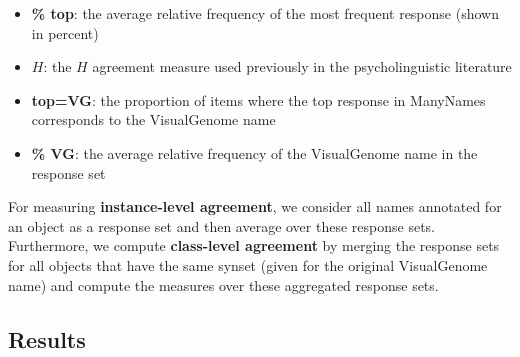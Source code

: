 \begin{itemize}
\item \textbf{\% top}: the average relative frequency of the most frequent response (shown in percent)
\item \textbf{$H$}: the $H$ agreement measure used previously in the psycholinguistic literature
\item \textbf{top=VG}: the proportion of items where the top response in ManyNames corresponds to the VisualGenome name
\item \textbf{\% VG}: the average relative frequency of the VisualGenome name in the response set

\end{itemize}

For measuring \textbf{instance-level agreement}, we consider all names annotated for an object as a response set and then average over these response sets. Furthermore, we compute \textbf{class-level agreement} by merging the response sets for all objects that have the same synset (given for the original VisualGenome name) and compute the measures over these aggregated response sets.

\subsection{Results}

